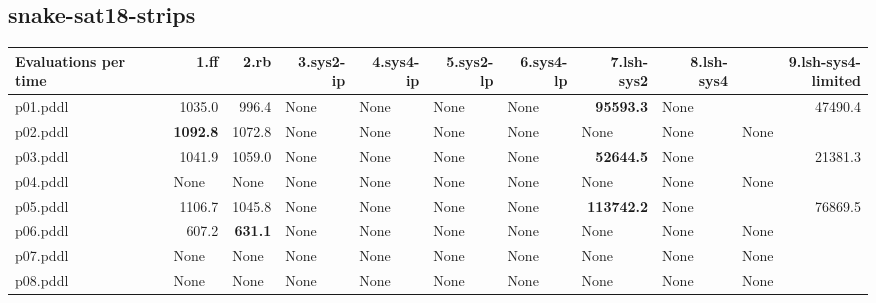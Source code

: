 \documentclass{article}
\begin{document}
\hypertarget{evaluations_per_time-snake-sat18-strips}{}
\subsection*{snake-sat18-strips}

\begin{tabular}{@{}lrrrrrrrrr@{}}
Evaluations per time & 1.ff & 2.rb & 3.sys2-ip & 4.sys4-ip & 5.sys2-lp & 6.sys4-lp & 7.lsh-sys2 & 8.lsh-sys4 & 9.lsh-sys4-limited \\
\midrule
p01.pddl & 1035.0 & 996.4 & \multicolumn{1}{|l|}{None} & \multicolumn{1}{|l|}{None} & \multicolumn{1}{|l|}{None} & \multicolumn{1}{|l|}{None} & \textbf{95593.3} & \multicolumn{1}{|l|}{None} & 47490.4 \\
p02.pddl & \textbf{1092.8} & 1072.8 & \multicolumn{1}{|l|}{None} & \multicolumn{1}{|l|}{None} & \multicolumn{1}{|l|}{None} & \multicolumn{1}{|l|}{None} & \multicolumn{1}{|l|}{None} & \multicolumn{1}{|l|}{None} & \multicolumn{1}{|l|}{None} \\
p03.pddl & 1041.9 & 1059.0 & \multicolumn{1}{|l|}{None} & \multicolumn{1}{|l|}{None} & \multicolumn{1}{|l|}{None} & \multicolumn{1}{|l|}{None} & \textbf{52644.5} & \multicolumn{1}{|l|}{None} & 21381.3 \\
p04.pddl & \multicolumn{1}{|l|}{None} & \multicolumn{1}{|l|}{None} & \multicolumn{1}{|l|}{None} & \multicolumn{1}{|l|}{None} & \multicolumn{1}{|l|}{None} & \multicolumn{1}{|l|}{None} & \multicolumn{1}{|l|}{None} & \multicolumn{1}{|l|}{None} & \multicolumn{1}{|l|}{None} \\
p05.pddl & 1106.7 & 1045.8 & \multicolumn{1}{|l|}{None} & \multicolumn{1}{|l|}{None} & \multicolumn{1}{|l|}{None} & \multicolumn{1}{|l|}{None} & \textbf{113742.2} & \multicolumn{1}{|l|}{None} & 76869.5 \\
p06.pddl & 607.2 & \textbf{631.1} & \multicolumn{1}{|l|}{None} & \multicolumn{1}{|l|}{None} & \multicolumn{1}{|l|}{None} & \multicolumn{1}{|l|}{None} & \multicolumn{1}{|l|}{None} & \multicolumn{1}{|l|}{None} & \multicolumn{1}{|l|}{None} \\
p07.pddl & \multicolumn{1}{|l|}{None} & \multicolumn{1}{|l|}{None} & \multicolumn{1}{|l|}{None} & \multicolumn{1}{|l|}{None} & \multicolumn{1}{|l|}{None} & \multicolumn{1}{|l|}{None} & \multicolumn{1}{|l|}{None} & \multicolumn{1}{|l|}{None} & \multicolumn{1}{|l|}{None} \\
p08.pddl & \multicolumn{1}{|l|}{None} & \multicolumn{1}{|l|}{None} & \multicolumn{1}{|l|}{None} & \multicolumn{1}{|l|}{None} & \multicolumn{1}{|l|}{None} & \multicolumn{1}{|l|}{None} & \multicolumn{1}{|l|}{None} & \multicolumn{1}{|l|}{None} & \multicolumn{1}{|l|}{None} \\

\end{tabular}
\end{document}
